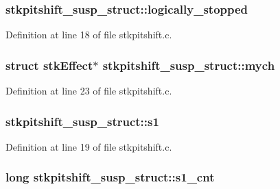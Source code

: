 \subsubsection[{\texorpdfstring{logically\+\_\+stopped}{logically_stopped}}]{ stkpitshift\+\_\+susp\+\_\+struct\+::logically\+\_\+stopped}\hypertarget{structstkpitshift__susp__struct_ad14982e9bfbfb176d203b30c4ac099d6}{}\label{structstkpitshift__susp__struct_ad14982e9bfbfb176d203b30c4ac099d6}


Definition at line 18 of file stkpitshift.\+c.

\subsubsection[{\texorpdfstring{mych}{mych}}]{\setlength{\rightskip}{0pt plus 5cm}struct {\bf stk\+Effect}$\ast$ stkpitshift\+\_\+susp\+\_\+struct\+::mych}\hypertarget{structstkpitshift__susp__struct_a074517b69c414d5b32e1011fde91403f}{}\label{structstkpitshift__susp__struct_a074517b69c414d5b32e1011fde91403f}


Definition at line 23 of file stkpitshift.\+c.

\subsubsection[{\texorpdfstring{s1}{s1}}]{ stkpitshift\+\_\+susp\+\_\+struct\+::s1}\hypertarget{structstkpitshift__susp__struct_a45ce494ddfcc4ff8474e97ca636fd2b8}{}\label{structstkpitshift__susp__struct_a45ce494ddfcc4ff8474e97ca636fd2b8}


Definition at line 19 of file stkpitshift.\+c.

\subsubsection[{\texorpdfstring{s1\+\_\+cnt}{s1_cnt}}]{\setlength{\rightskip}{0pt plus 5cm}long stkpitshift\+\_\+susp\+\_\+struct\+::s1\+\_\+cnt}\hypertarget{structstkpitshift__susp__struct_a576d774fdf6cb56660274e6bbb780537}{}\label{structstkpitshift__susp__struct_a576d774fdf6cb56660274e6bbb780537}


